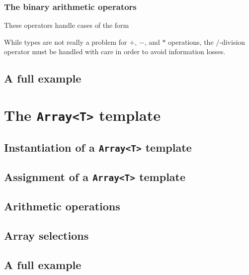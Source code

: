 \subsubsection{The binary arithmetic operators}
These operators handle cases of the form



While types are not really a problem for $+$, $-$, and $*$ operations, the $/$-division operator must be handled with care in order to avoid information 
losses. 

\subsection{A full example}

\section{The {\tt Array<T>} template}

\subsection{Instantiation of a {\tt Array<T>} template}

\subsection{Assignment of a {\tt Array<T>} template}

\subsection{Arithmetic operations}

\subsection{Array selections}

\subsection{A full example}